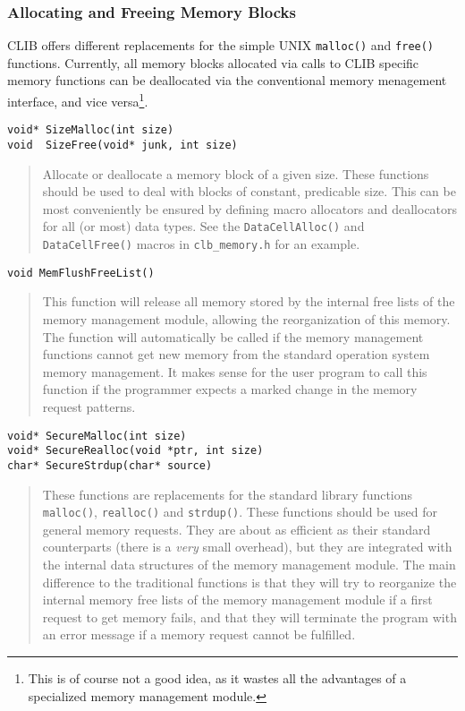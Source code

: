 \subsubsection{Allocating and Freeing Memory Blocks}

CLIB offers different replacements for the simple UNIX
\texttt{malloc()} and \texttt{free()} functions. Currently, all memory
blocks allocated via calls to CLIB specific memory functions can be
deallocated via the conventional memory menagement interface, and vice
versa\footnote{This is of course not a good idea, as it wastes all the
  advantages of a specialized memory management module.}.

\begin{verbatim}
void* SizeMalloc(int size)
void  SizeFree(void* junk, int size)
\end{verbatim}
\begin{quote}
  Allocate or deallocate a memory block of a given size. These
  functions should be used to deal with blocks of constant, predicable
  size. This can be most conveniently be ensured by defining macro
  allocators and deallocators for all (or most) data types. See the
  \texttt{DataCellAlloc()} and \texttt{DataCellFree()} macros in
  \texttt{clb\_memory.h} for an example.
\end{quote}

\begin{verbatim}
void MemFlushFreeList()
\end{verbatim}
\begin{quote}
  This function will release all memory stored by the internal free
  lists of the memory management module, allowing the reorganization
  of this memory. The function will automatically be called if the
  memory management functions cannot get new memory from the standard
  operation system memory management. It makes sense for the user
  program to call this function if the programmer expects a marked
  change in the memory request patterns.
\end{quote}

\begin{verbatim}
void* SecureMalloc(int size)
void* SecureRealloc(void *ptr, int size)
char* SecureStrdup(char* source)
\end{verbatim}
\begin{quote}
  These functions are replacements for the standard library functions
  \texttt{malloc()}, \texttt{realloc()} and \texttt{strdup()}. These
  functions should be used for general memory requests. They are about
  as efficient as their standard counterparts (there is a \emph{very}
  small overhead), but they are integrated with the internal data
  structures of the memory management module.  The main difference to
  the traditional functions is that they will try to reorganize the
  internal memory free lists of the memory management module if a
  first request to get memory fails, and that they will terminate the
  program with an error message if a memory request cannot be
  fulfilled.
\end{quote}

